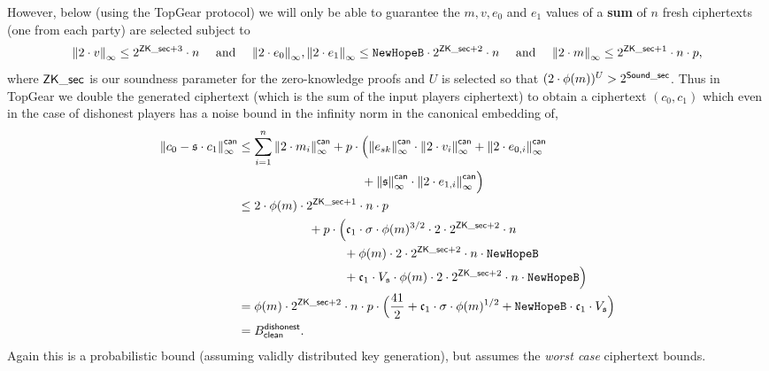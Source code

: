 \noindent
However, below (using the TopGear protocol)
we will only be able to guarantee the $m, v, e_0$ and $e_1$
values of a {\bf sum} of $n$ fresh ciphertexts
(one from each party) are selected subject to
\[ {\Vert 2 \cdot v \Vert}_\infty \le 2^{\mathsf{ZK\_sec} + 3} \cdot n \quad
  \mbox{  and  } \quad
  {\Vert 2 \cdot e_0 \Vert}_\infty, {\Vert 2 \cdot e_1 \Vert}_\infty \le \texttt{NewHopeB} \cdot 2^{\mathsf{ZK\_sec} + 2} \cdot n \quad
  \mbox{  and  } \quad
  {\Vert 2 \cdot m \Vert}_\infty \le 2^{\mathsf{ZK\_sec} + 1} \cdot n \cdot p,
\]
where $\mathsf{ZK\_sec}$ is our soundness parameter for the
zero-knowledge proofs and $U$ is selected so that
$(2 \cdot \phi(m))^U > 2^{\mathsf{Sound\_sec}}$.
Thus in TopGear we double the generated ciphertext
(which is the sum of the input players ciphertext)
to obtain a ciphertext $(c_0,c_1)$ which even in the
case of dishonest players has a noise bound in the
infinity norm in the canonical embedding of,
\begin{align*}
  \norm{c_0 - \sk \cdot c_1}_\infty^\can
   & \le \sum_{i=1}^n
  \norm{2 \cdot m_i}_\infty^\can
  + p \cdot \Big(\norm{e_{sk}}_\infty^\can \cdot \norm{2 \cdot v_i}_\infty^\can
  + \norm{2 \cdot e_{0,i}}_\infty^\can                                       \\
   & \hspace{3.5cm}
  + \norm{\sk}_\infty^\can \cdot \norm{2 \cdot e_{1,i}}_\infty^\can \Big)    \\
   & \le 2 \cdot \phi(m) \cdot 2^{\ZKsecp+1} \cdot n \cdot p                 \\
   & \hspace{2cm}
  + p \cdot \Big(
  \gc_1 \cdot \sigma \cdot \phi(m)^{3/2} \cdot 2 \cdot 2^{\ZKsecp+2} \cdot n \\
   & \hspace{3cm}
  + \phi(m) \cdot 2 \cdot  2^{\ZKsecp+2} \cdot n \cdot \texttt{NewHopeB}     \\
   & \hspace{3cm}
  +  \gc_1 \cdot V_\sk \cdot \phi(m) \cdot 2 \cdot 2^{\ZKsecp+2} \cdot n \cdot \texttt{NewHopeB}
  \Big)                                                                      \\
   & =\phi(m) \cdot 2^{\ZKsecp+2} \cdot n \cdot p
  \cdot \Big( \frac{41}{2} + \gc_1 \cdot \sigma \cdot \phi(m)^{1/2}
  +  \texttt{NewHopeB} \cdot \gc_1 \cdot V_\sk
  \Big)                                                                      \\
   & = B_\clean^\dishonest.
\end{align*}
Again this is a probabilistic bound (assuming validly
distributed key generation), but assumes the {\em worst case}
ciphertext bounds.

